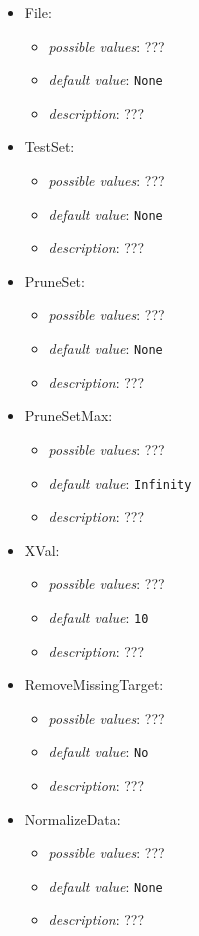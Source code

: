 \documentclass{article}
\begin{document}
\begin{itemize}
    \item File:
           \begin{itemize}
                \item \emph{possible values}: ???
                \item \emph{default value}: \texttt{None}
                \item \emph{description}: ???
           \end{itemize}
    \item TestSet:
           \begin{itemize}
                \item \emph{possible values}: ???
                \item \emph{default value}: \texttt{None}
                \item \emph{description}: ???
           \end{itemize}
    \item PruneSet:
           \begin{itemize}
                \item \emph{possible values}: ???
                \item \emph{default value}: \texttt{None}
                \item \emph{description}: ???
           \end{itemize}
    \item PruneSetMax:
           \begin{itemize}
                \item \emph{possible values}: ???
                \item \emph{default value}: \texttt{Infinity}
                \item \emph{description}: ???
           \end{itemize}
    \item XVal:
           \begin{itemize}
                \item \emph{possible values}: ???
                \item \emph{default value}: \texttt{10}
                \item \emph{description}: ???
           \end{itemize}
    \item RemoveMissingTarget:
           \begin{itemize}
                \item \emph{possible values}: ???
                \item \emph{default value}: \texttt{No}
                \item \emph{description}: ???
           \end{itemize}
    \item NormalizeData:
           \begin{itemize}
                \item \emph{possible values}: ???
                \item \emph{default value}: \texttt{None}
                \item \emph{description}: ???
           \end{itemize}
\end{itemize}
\end{document}
